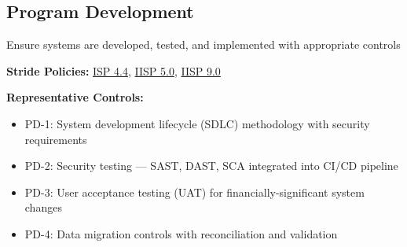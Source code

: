 \documentclass[11pt,landscape]{article}
\begin{document}
\subsection{Program Development}

Ensure systems are developed, tested, and implemented with appropriate controls

\textbf{Stride Policies:} \hyperref[pol:ISP44]{ISP 4.4}, \hyperref[pol:IISP50]{IISP 5.0}, \hyperref[pol:IISP90]{IISP 9.0}

\textbf{Representative Controls:}
\begin{itemize}[leftmargin=*]
  \item PD-1: System development lifecycle (SDLC) methodology with security requirements
  \item PD-2: Security testing --- SAST, DAST, SCA integrated into CI/CD pipeline
  \item PD-3: User acceptance testing (UAT) for financially-significant system changes
  \item PD-4: Data migration controls with reconciliation and validation
\end{itemize}
\end{document}
